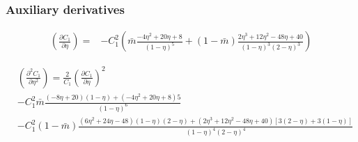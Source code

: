 \documentclass[internal,english]{sintefmemo2012}
\newcommand*{\pder}[2]{\left(\frac{\partial #1}{\partial #2}\right)}
\newcommand*{\pdder}[2]{\left(\frac{\partial^2 #1}{\partial #2^2}\right)}
\newcommand*{\pdcross}[3]{\left(\frac{\partial^2 #1}{\partial #2 \partial #3}\right)}
\newcommand{\lp}{\left(}
\newcommand{\rp}{\right)}
\begin{document}







\subsubsection*{Auxiliary derivatives}
\begin{align}
  \pder{C_1}{\eta} = & -C_1^2 \lp \bar m \frac{-4 \eta^2 + 20 \eta + 8}{(1 - \eta)^5} +  (1-\bar m) \frac{2 \eta^3+12 \eta^2-48 \eta+40}{(1-\eta)^3 (2-\eta)^3} \rp
\end{align}

\begin{equation}
  \begin{aligned}
    &\pdder{C_1}{\eta} = \frac{2}{C_1} \pder{C_1}{\eta}^2 \\
    &- C_1^2 \bar m \frac{(-8 \eta + 20)(1-\eta) + (-4 \eta^2 + 20 \eta + 8) 5 }{(1 - \eta)^6} \\
    &- C_1^2 (1-\bar m) \frac{(6 \eta^2+24 \eta - 48)(1-\eta) (2-\eta) + (2 \eta^3+12 \eta^2-48 \eta+40)[3(2-\eta) + 3(1-\eta)] }{(1-\eta)^4 (2-\eta)^4}
  \end{aligned}
\end{equation}
\end{document}
